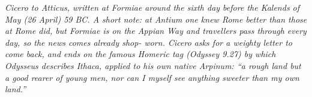 
\textit{Cicero to Atticus, written at Formiae around the
sixth day before the Kalends of May (26 April) 59 BC. A
short note: at Antium one knew Rome better than those at
Rome did, but Formiae is on the Appian Way and travellers
pass through every day, so the news comes already shop-
worn. Cicero asks for a weighty letter to come back, and
ends on the famous Homeric tag (Odyssey 9.27) by which
Odysseus describes Ithaca, applied to his own native
Arpinum: ``a rough land but a good rearer of young men,
nor can I myself see anything sweeter than my own land.''}
